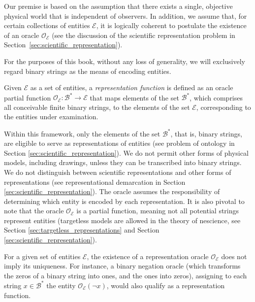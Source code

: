 Our premise is based on the assumption that there exists a single, objective physical world that is independent of observers. In addition, we assume that, for certain collections of entities $\mathcal{E}$, it is logically coherent to postulate the existence of an oracle $\mathcal{O}_\mathcal{E}$ (see the discussion of the scientific representation problem in Section~\ref{sec:scientific_representation}).

For the purposes of this book, without any loss of generality, we will exclusively regard binary strings as the means of encoding entities.

\begin{definition}
\label{def:descriptions_topic}
Given $\mathcal{E}$ as a set of entities, a \emph{representation function} is defined as an oracle partial function $\mathcal{O}_\mathcal{E}:\mathcal{B}^\ast \rightarrow \mathcal{E}$ that maps elements of the set $\mathcal{B}^\ast$, which comprises all conceivable finite binary strings, to the elements of the set $\mathcal{E}$, corresponding to the entities under examination.
\end{definition}

Within this framework, only the elements of the set $\mathcal{B}^\ast$, that is, binary strings, are eligible to serve as representations of entities (see problem of ontology in Section \ref{sec:scientific_representation}). We do not permit other forms of physical models, including drawings, unless they can be transcribed into binary strings. We do not distinguish between scientific representations and other forms of representations (see representational demarcation in Section \ref{sec:scientific_representation}). The oracle assumes the responsibility of determining which entity is encoded by each representation. It is also pivotal to note that the oracle $\mathcal{O}_\mathcal{E}$ is a partial function, meaning not all potential strings represent entities (targetless models are allowed in the theory of nescience, see Section \ref{sec:targetless_representations} and Section \ref{sec:scientific_representation}).

\begin{example}
\label{ex:not_unique_oracle}
For a given set of entities $\mathcal{E}$, the existence of a representation oracle $\mathcal{O}_\mathcal{E}$ does not imply its uniqueness. For instance, a binary negation oracle (which transforms the zeros of a binary string into ones, and the ones into zeros), assigning to each string $x \in \mathcal{B}^\ast$ the entity $\mathcal{O}_\mathcal{E} \left( \neg x \right)$, would also qualify as a representation function.
\end{example}

